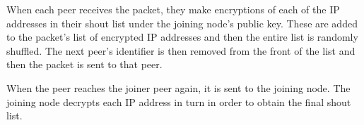 \documentclass[ %
                    author={Luke Murray},
                supervisor={Dr. Simon Hollis},
                     title={Shadow Peer-to-Peer Networks},
                  subtitle={},
                    degree={MEng},
                      year={2013} ]{thesis}
\begin{document}
When each peer receives the packet, they make encryptions of each of the IP addresses in their shout list under the joining node's public key. These are added to the packet's list of encrypted IP addresses and then the entire list is randomly shuffled. The next peer's identifier is then removed from the front of the list and then the packet is sent to that peer.

When the peer reaches the joiner peer again, it is sent to the joining node. The joining node decrypts each IP address in turn in order to obtain the final shout list.

\end{document}
